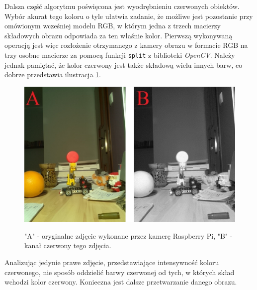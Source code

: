 Dalsza część algorytmu poświęcona jest wyodrębnieniu czerwonych obiektów. Wybór akurat tego koloru o tyle ułatwia zadanie, że możliwe jest pozostanie przy omówionym wcześniej modelu RGB, w którym jedna z trzech macierzy składowych obrazu odpowiada za ten właśnie kolor. Pierwszą wykonywaną operacją jest więc rozłożenie otrzymanego z kamery obrazu w formacie RGB na trzy osobne macierze za pomocą funkcji \texttt{split} z biblioteki \textit{OpenCV}. Należy jednak pamiętać, że kolor czerwony jest także składową wielu innych barw, co dobrze przedstawia ilustracja \ref{red}.
\begin{figure}[H]
\begin{center}
\includegraphics[scale=0.42]{imgs/imgBase+Red.jpg}
\caption[Uzyskany kanał czerwony wraz z oryginalny obrazem.]\small{"A" - oryginalne zdjęcie wykonane przez kamerę Raspberry Pi, "B" - kanał czerwony tego zdjęcia.}
\label{red}
\end{center}
\end{figure}
Analizując jedynie prawe zdjęcie, przedstawiające intensywność koloru czerwonego, nie sposób oddzielić barwy czerwonej od tych, w których skład wchodzi kolor czerwony. Konieczna jest dalsze przetwarzanie danego obrazu.

